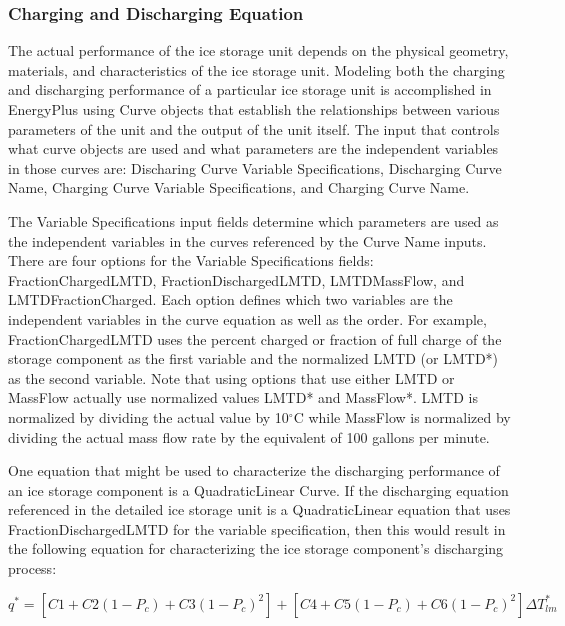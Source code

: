 \subsubsection{Charging and Discharging Equation}\label{charging-and-discharging-equation}

The actual performance of the ice storage unit depends on the physical geometry, materials, and characteristics of the ice storage unit. Modeling both the charging and discharging performance of a particular ice storage unit is accomplished in EnergyPlus using Curve objects that establish the relationships between various parameters of the unit and the output of the unit itself. The input that controls what curve objects are used and what parameters are the independent variables in those curves are: Discharing Curve Variable Specifications, Discharging Curve Name, Charging Curve Variable Specifications, and Charging Curve Name.

The Variable Specifications input fields determine which parameters are used as the independent variables in the curves referenced by the Curve Name inputs.  There are four options for the Variable Specifications fields: FractionChargedLMTD, FractionDischargedLMTD, LMTDMassFlow, and LMTDFractionCharged.  Each option defines which two variables are the independent variables in the curve equation as well as the order.  For example, FractionChargedLMTD uses the percent charged or fraction of full charge of the storage component as the first variable and the normalized LMTD (or LMTD*) as the second variable.  Note that using options that use either LMTD or MassFlow actually use normalized values LMTD* and MassFlow*.  LMTD is normalized by dividing the actual value by 10\(^{\circ}\)C while MassFlow is normalized by dividing the actual mass flow rate by the equivalent of 100 gallons per minute.  

One equation that might be used to characterize the discharging performance of an ice storage component is a QuadraticLinear Curve.  If the discharging equation referenced in the detailed ice storage unit is a QuadraticLinear equation that uses FractionDischargedLMTD for the variable specification, then this would result in the following equation for characterizing the ice storage component's discharging process:

\begin{equation}
{q^*} = \left[ {C1 + C2\left( {1 - {P_c}} \right) + C3{{\left( {1 - {P_c}} \right)}^2}} \right] + \left[ {C4 + C5\left( {1 - {P_c}} \right) + C6{{\left( {1 - {P_c}} \right)}^2}} \right]\Delta T_{lm}^*
\end{equation}

